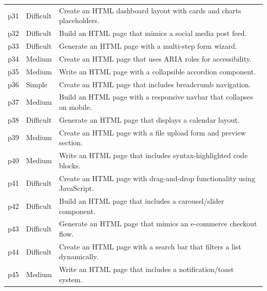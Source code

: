 \begin{longtable}{@{} l l p{13cm} @{}}
	p31         & Difficult           & Create an HTML dashboard layout with cards and charts placeholders.                                \\
	p32         & Difficult           & Build an HTML page that mimics a social media post feed.                                           \\
	p33         & Difficult           & Generate an HTML page with a multi-step form wizard.                                               \\
	p34         & Medium              & Create an HTML page that uses ARIA roles for accessibility.                                        \\
	p35         & Medium              & Write an HTML page with a collapsible accordion component.                                         \\
	p36         & Simple              & Create an HTML page that includes breadcrumb navigation.                                           \\
	p37         & Medium              & Build an HTML page with a responsive navbar that collapses on mobile.                              \\
	p38         & Difficult           & Generate an HTML page that displays a calendar layout.                                             \\
	p39         & Medium              & Create an HTML page with a file upload form and preview section.                                   \\
	p40         & Medium              & Write an HTML page that includes syntax-highlighted code blocks.                                   \\
	p41         & Difficult           & Create an HTML page with drag-and-drop functionality using JavaScript.                             \\
	p42         & Difficult           & Build an HTML page that includes a carousel/slider component.                                      \\
	p43         & Difficult           & Generate an HTML page that mimics an e-commerce checkout flow.                                     \\
	p44         & Difficult           & Create an HTML page with a search bar that filters a list dynamically.                             \\
	p45         & Medium              & Write an HTML page that includes a notification/toast system.                                      \\

\end{longtable}
